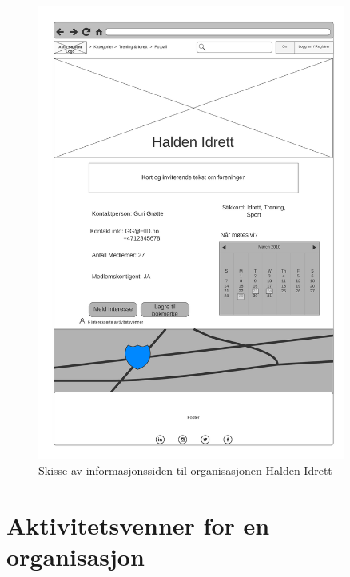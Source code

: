 \begin{figure}[H]
\centering
\includegraphics[width=0.9\textwidth]{Illustrasjoner/Skisser/2.0/2-4-organisasjonsside.png}
\caption{Skisse av informasjonssiden til organisasjonen Halden Idrett}
\label{vedlegg:2-4-org-side}
\end{figure}

\section{Aktivitetsvenner for en organisasjon}

